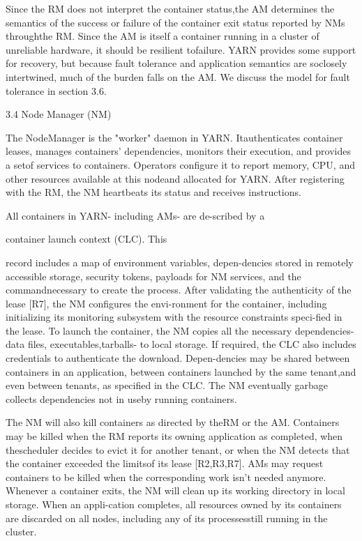 Since the RM does not interpret the container status,the AM determines the semantics of the success or failure of the container exit status reported by NMs throughthe RM. Since the AM is itself a container running in a
cluster of unreliable hardware, it should be resilient tofailure. YARN provides some support for recovery, but
because fault tolerance and application semantics are soclosely intertwined, much of the burden falls on the AM.
We discuss the model for fault tolerance in section 3.6.

3.4 Node Manager (NM)

The NodeManager is the "worker" daemon in YARN. Itauthenticates container leases, manages containers' dependencies, monitors their execution, and provides a setof services to containers. Operators configure it to report
memory, CPU, and other resources available at this nodeand allocated for YARN. After registering with the RM,
the NM heartbeats its status and receives instructions.

All containers in YARN- including AMs- are de-scribed by a

container launch context (CLC). This

record includes a map of environment variables, depen-dencies stored in remotely accessible storage, security
tokens, payloads for NM services, and the commandnecessary to create the process. After validating the authenticity of the lease [R7], the NM configures the envi-ronment for the container, including initializing its monitoring subsystem with the resource constraints speci-fied in the lease. To launch the container, the NM copies
all the necessary dependencies- data files, executables,tarballs- to local storage. If required, the CLC also includes credentials to authenticate the download. Depen-dencies may be shared between containers in an application, between containers launched by the same tenant,and even between tenants, as specified in the CLC. The
NM eventually garbage collects dependencies not in useby running containers.

The NM will also kill containers as directed by theRM or the AM. Containers may be killed when the RM
reports its owning application as completed, when thescheduler decides to evict it for another tenant, or when
the NM detects that the container exceeded the limitsof its lease [R2,R3,R7]. AMs may request containers to
be killed when the corresponding work isn't needed anymore. Whenever a container exits, the NM will clean up
its working directory in local storage. When an appli-cation completes, all resources owned by its containers
are discarded on all nodes, including any of its processesstill running in the cluster.

